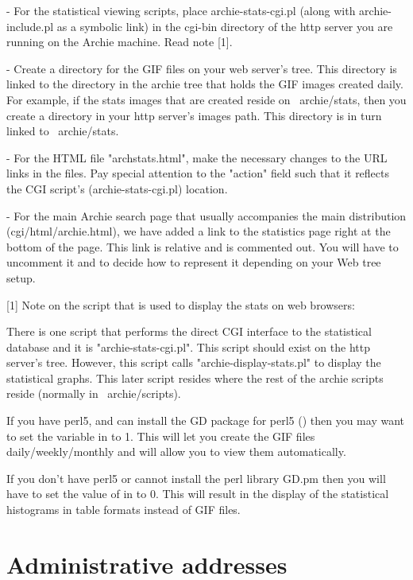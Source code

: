   - For the statistical viewing scripts, place archie-stats-cgi.pl
    (along with archie-include.pl as a symbolic link) in the cgi-bin
    directory of the http server you are running on the Archie machine.
    Read note [1].

  - Create a directory for the GIF files on your web server's
    tree. This directory is linked to the directory in the archie tree
    that holds the GIF images created daily.  For example, if the stats
    images that are created reside on ~archie/stats, then you create a
    directory in your http server's images path. This directory is in
    turn linked to ~archie/stats.

  - For the HTML file "archstats.html", make the necessary changes to
    the URL links in the files.  Pay special attention to the "action"
    field such that it reflects the CGI script's (archie-stats-cgi.pl)
    location.

  - For the main Archie search page that usually accompanies the main
    distribution (cgi/html/archie.html), we have added a link to the
    statistics page right at the bottom of the page.  This link is
    relative and is commented out. You will have to uncomment it and to
    decide how to represent it depending on your Web tree setup.


  [1] Note on the script that is used to display the stats on web browsers:


   There is one script that performs the direct CGI interface to the
   statistical database and it is "archie-stats-cgi.pl". This script should
   exist on the http server's tree. However, this script calls
   "archie-display-stats.pl" to display the statistical graphs. This later
   script resides where the rest of the archie scripts reside (normally in
   ~archie/scripts).

   If you have perl5, and can install the GD package for perl5
   () then you may want to set the variable
    in  to 1.  This will let you create the
   GIF files daily/weekly/monthly and will allow you to view them
   automatically.

   If you don't have perl5 or cannot install the perl library GD.pm then you
   will have to set the value of  in
    to 0. This will result in the display of the
   statistical histograms in table formats instead of GIF files.



\section{Administrative addresses}


